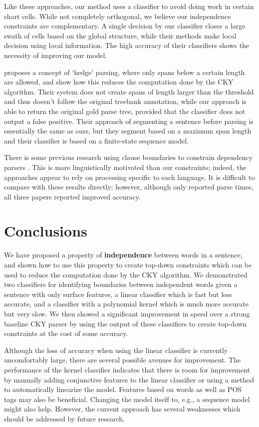 \documentclass[11pt]{article}
\begin{document}
Like these approaches, our method uses a classifier to avoid doing
work in certain chart cells. While not completely orthogonal, we
believe our independence constraints are complementary. A single
decision by our classifier closes a large swath of cells based on the
global structure, while their methods make local decision using local
information. The high accuracy of their classifiers shows the necessity
of improving our model.

\cite{Yarmohammadi2014} proposes a concept of `hedge' parsing, where only spans
below a certain length are allowed, and show how this reduces the computation
done by the CKY algorithm. Their system does not create spans of length larger
than the threshold and thus doesn't follow the original treebank annotation,
while our approach is able to return the original gold parse tree, provided that
the classifier does not output a false positive. Their approach of segmenting a
sentence before parsing is essentially the same as ours, but they segment based
on a maximum span length and their classifier is based on a finite-state
sequence model.

There is some previous research using clause boundaries to constrain dependency
parsers \cite{Ohno2006,Husain2011,Kim2004}. This is more linguistically
motivated than our constraints; indeed, the approaches appear to rely on
processing specific to each language. It is difficult to compare with these
results directly; however, although only \cite{Ohno2006} reported parse times,
all three papers reported improved accuracy.

\section{Conclusions}
\label{sec-7}

We have proposed a property of \textbf{independence} between words in a sentence, and
shown how to use this property to create top-down constraints which can be used
to reduce the computation done by the CKY algorithm. We demonstrated two
classifiers for identifying boundaries between independent words given a
sentence with only surface features, a linear classifier which is fast but less
accurate, and a classifier with a polynomial kernel which is much more accurate
but very slow. We then showed a significant improvement in speed over a strong
baseline CKY parser by using the output of these classifiers to create top-down
constraints at the cost of some accuracy.

Although the loss of accuracy when using the linear classifier is currently
uncomfortably large, there are several possible avenues for improvement. The
performance of the kernel classifier indicates that there is room for
improvement by manually adding conjunctive features to the linear classifier or
using a method to automatically linearize the model. Features based on words as
well as POS tags may also be beneficial. Changing the model itself to, e.g., a
sequence model might also help. However, the current approach has several
weaknesses which should be addressed by future research.
\end{document}

